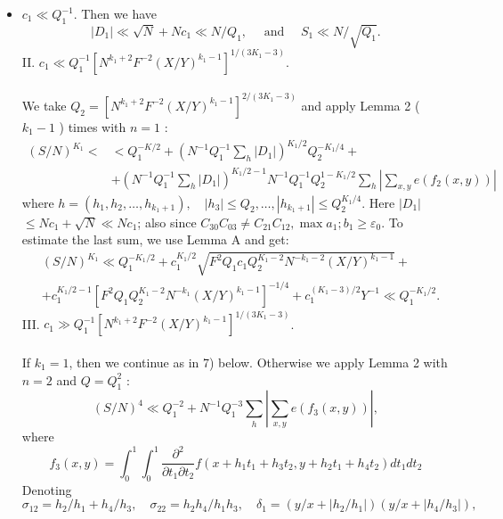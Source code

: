 \documentclass[10pt]{article}
\begin{document}
\begin{itemize}
  \item[I.] $c_{1} \ll Q_{1}^{-1}$. Then we have
$$
\left|D_{1}\right| \ll \sqrt{N}+N c_{1} \ll N / Q_{1}, \quad \text { and } \quad S_{1} \ll N / \sqrt{Q_{1}} .
$$
II. $c_{1} \ll Q_{1}^{-1}\left[N^{k_{1}+2} F^{-2}(X / Y)^{k_{1}-1}\right]^{1 /\left(3 K_{1}-3\right)}$.\\
\\
We take $Q_{2}=\left[N^{k_{1}+2} F^{-2}(X / Y)^{k_{1}-1}\right]^{2 /\left(3 K_{1}-3\right)}$ and apply Lemma 2 ( $k_{1}-1$ ) times with $n=1$ :
$$
\begin{aligned}
(S / N)^{K_{1}}< & <Q_{1}^{-K / 2}+\left(N^{-1} Q_{1}^{-1} \sum_{h}\left|D_{1}\right|\right)^{K_{1} / 2} Q_{2}^{-K_{1} / 4}+ \\
& +\left(N^{-1} Q_{1}^{-1} \sum_{h}\left|D_{1}\right|\right)^{K_{1} / 2-1} N^{-1} Q_{1}^{-1} Q_{2}^{1-K_{1} / 2} \sum_{h}\left|\sum_{x, y} e\left(f_{2}(x, y)\right)\right|
\end{aligned}
$$
where $h=\left(h_{1}, h_{2}, \ldots, h_{k_{1}+1}\right), \quad\left|h_{3}\right| \leqslant Q_{2}, \ldots,\left|h_{k_{1}+1}\right| \leqslant Q_{2}^{K_{1} / 4}$. Here $\left|D_{1}\right|$ $\leqslant N c_{1}+\sqrt{N} \ll N c_{1}$; also since $C_{30} C_{03} \neq C_{21} C_{12}, \max a_{1} ; b_{1} \geqslant \varepsilon_{0}$. To estimate the last sum, we use Lemma A and get:
$$
\begin{aligned}
& (S / N)^{K_{1}} \ll Q_{1}^{-K_{1} / 2}+c_{1}^{K_{1} / 2} \sqrt{F^{2} Q_{1} c_{1} Q_{2}^{K_{1}-2} N^{-k_{1}-2}(X / Y)^{k_{1}-1}}+ \\
& +c_{1}^{K_{1} / 2-1}\left[F^{2} Q_{1} Q_{2}^{K_{1}-2} N^{-k_{1}}(X / Y)^{k_{1}-1}\right]^{-1 / 4}+c_{1}^{\left(K_{1}-3\right) / 2} Y^{-1} \ll Q_{1}^{-K_{1} / 2} .
\end{aligned}
$$
III. $c_{1} \gg Q_{1}^{-1}\left[N^{k_{1}+2} F^{-2}(X / Y)^{k_{1}-1}\right]^{1 /\left(3 K_{1}-3\right)}$.\\
\\
If $k_{1}=1$, then we continue as in 7) below. Otherwise we apply Lemma 2 with $n=2$ and $Q=Q_{1}^{2}$ :
$$
(S / N)^{4} \ll Q_{1}^{-2}+N^{-1} Q_{1}^{-3} \sum_{h}\left|\sum_{x, y} e\left(f_{3}(x, y)\right)\right|,
$$
where
$$
f_{3}(x, y)=\int_{0}^{1} \int_{0}^{1} \frac{\partial^{2}}{\partial t_{1} \partial t_{2}} f\left(x+h_{1} t_{1}+h_{3} t_{2}, y+h_{2} t_{1}+h_{4} t_{2}\right) d t_{1} d t_{2}
$$
Denoting
$$
\sigma_{12}=h_{2} / h_{1}+h_{4} / h_{3}, \quad \sigma_{22}=h_{2} h_{4} / h_{1} h_{3}, \quad \delta_{1}=\left(y / x+\left|h_{2} / h_{1}\right|\right)\left(y / x+\left|h_{4} / h_{3}\right|\right),
$$
\end{itemize}
\end{document}
